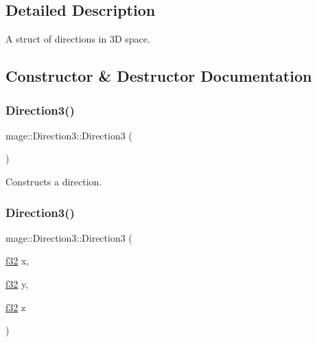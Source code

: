 \subsection{Detailed Description}
A struct of directions in 3D space. 

\subsection{Constructor \& Destructor Documentation}
\hypertarget{structmage_1_1_direction3_a1c3d06aa13b207f86df36f5f3cfe486a}{}\label{structmage_1_1_direction3_a1c3d06aa13b207f86df36f5f3cfe486a} 
\subsubsection{\texorpdfstring{Direction3()}{Direction3()}\hspace{0.1cm}{\footnotesize\ttfamily [1/8]}}
{\footnotesize\ttfamily mage\+::\+Direction3\+::\+Direction3 (\begin{DoxyParamCaption}{ }\end{DoxyParamCaption})\hspace{0.3cm}{\ttfamily [noexcept]}}

Constructs a direction. \hypertarget{structmage_1_1_direction3_a55aade58b37a87e820b8483c80793de5}{}\label{structmage_1_1_direction3_a55aade58b37a87e820b8483c80793de5} 
\subsubsection{\texorpdfstring{Direction3()}{Direction3()}\hspace{0.1cm}{\footnotesize\ttfamily [2/8]}}
{\footnotesize\ttfamily mage\+::\+Direction3\+::\+Direction3 (\begin{DoxyParamCaption}\item[{\hyperlink{namespacemage_a6a44ad388483959dc4dff9f2aef91431}{f32}}]{x,  }\item[{\hyperlink{namespacemage_a6a44ad388483959dc4dff9f2aef91431}{f32}}]{y,  }\item[{\hyperlink{namespacemage_a6a44ad388483959dc4dff9f2aef91431}{f32}}]{z }\end{DoxyParamCaption})\hspace{0.3cm}{\ttfamily [noexcept]}}

